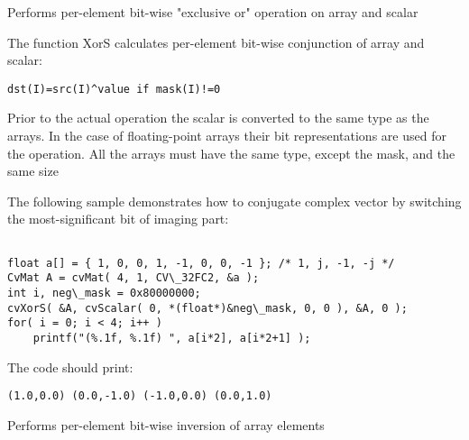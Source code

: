 \label{XorS}

Performs per-element bit-wise "exclusive or" operation on array and scalar


\begin{description}
\end{description}


The function XorS calculates per-element bit-wise conjunction of array and scalar:

\begin{lstlisting}
dst(I)=src(I)^value if mask(I)!=0
\end{lstlisting}

Prior to the actual operation the scalar is converted to the same type as the arrays. In the case of floating-point arrays their bit representations are used for the operation. All the arrays must have the same type, except the mask, and the same size

The following sample demonstrates how to conjugate complex vector by switching the most-significant bit of imaging part:

\begin{lstlisting}

float a[] = { 1, 0, 0, 1, -1, 0, 0, -1 }; /* 1, j, -1, -j */
CvMat A = cvMat( 4, 1, CV\_32FC2, &a );
int i, neg\_mask = 0x80000000;
cvXorS( &A, cvScalar( 0, *(float*)&neg\_mask, 0, 0 ), &A, 0 );
for( i = 0; i < 4; i++ )
    printf("(%.1f, %.1f) ", a[i*2], a[i*2+1] );

\end{lstlisting}

The code should print:

\begin{lstlisting}
(1.0,0.0) (0.0,-1.0) (-1.0,0.0) (0.0,1.0)
\end{lstlisting}

\label{Not}

Performs per-element bit-wise inversion of array elements


